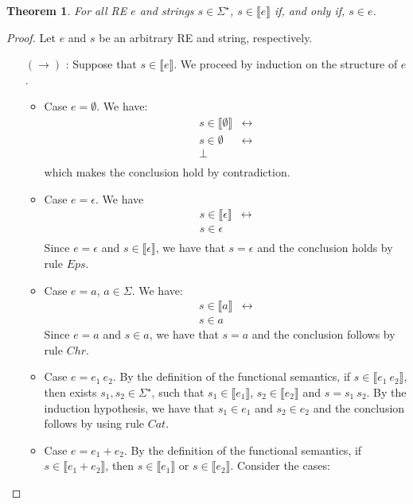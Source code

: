 \documentclass[oneside,12pt]{scrbook}
\newtheorem{Theorem}{Theorem}
\theoremstyle{definition}
\newcommand{\sembrackets}[1]{\ensuremath{\llbracket #1 \rrbracket}}
\theoremstyle{plain}
\theoremstyle{definition}
\begin{document}
\begin{Theorem}
	For all RE $e$ and strings $s \in \Sigma^\star$, $s \in \sembrackets{e}$ if, and only if, $s \in e$.
\end{Theorem}
\begin{proof}
	Let $e$ and $s$ be an arbitrary RE and string, respectively.
	\begin{itemize}
		\item[$(\to)$]: Suppose that $s \in\sembrackets{e}$. We proceed by induction on the structure of $e$.
		\begin{itemize}
			\item Case $e = \emptyset$. We have:
			\begin{align*}
			s \in \sembrackets{\emptyset}  & \leftrightarrow \\
			s \in \emptyset                & \leftrightarrow \\
			\bot \\
			\end{align*}
			which makes the conclusion hold by contradiction.
			\item Case $e = \epsilon$. We have
			\begin{align*}
			s \in\sembrackets{\epsilon} & \leftrightarrow \\
			s \in \epsilon \\
			\end{align*}
			Since $e = \epsilon$ and $s \in \sembrackets{\epsilon}$, we have that $s = \epsilon$ and
			the conclusion holds by rule $Eps$.
			\item Case $e = a$, $a \in \Sigma$. We have:
			\begin{align*}
			s \in\sembrackets{a} & \leftrightarrow \\
			s \in a
			\end{align*}
			Since $e = a$ and $s \in a$, we have that $s = a$ and the conclusion follows by rule $Chr$.
			\item Case $e = e_1\:e_2$. By the definition of the functional semantics, if $s \in \sembrackets{e_1\:e_2}$,
			then exists $s_1,s_2 \in \Sigma^\star$, such that $s_1 \in\sembrackets{e_1}$, $s_2 \in\sembrackets{e_2}$ and
			$s = s_1\:s_2$. By the induction hypothesis, we have that $s_1 \in e_1$ and $s_2 \in e_2$ and the conclusion
			follows by using rule $Cat$.
			\item Case $e = e_1 + e_2$. By the definition of the functional semantics, if $s \in \sembrackets{e_1 + e_2}$, then
			$s \in\sembrackets{e_1}$ or $s\in\sembrackets{e_2}$. Consider the cases:
			\begin{itemize}

\end{itemize}
\end{itemize}
\end{itemize}
\end{proof}
\end{document}

